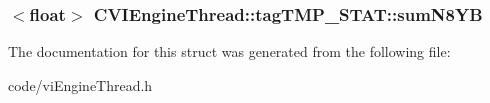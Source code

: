 \hypertarget{struct_c_v_i_engine_thread_1_1tag_t_m_p___s_t_a_t_a6528ccd41f3f8149da880e6d6ce20b08}{
\subsubsection[{sum\+N8\+Y\+B}]{$<$float$>$ C\+V\+I\+Engine\+Thread\+::tag\+T\+M\+P\+\_\+\+S\+T\+A\+T\+::sum\+N8\+Y\+B}}\label{struct_c_v_i_engine_thread_1_1tag_t_m_p___s_t_a_t_a6528ccd41f3f8149da880e6d6ce20b08}






The documentation for this struct was generated from the following file\+:\begin{DoxyCompactItemize}
\item 
code/vi\+Engine\+Thread.\+h\end{DoxyCompactItemize}
